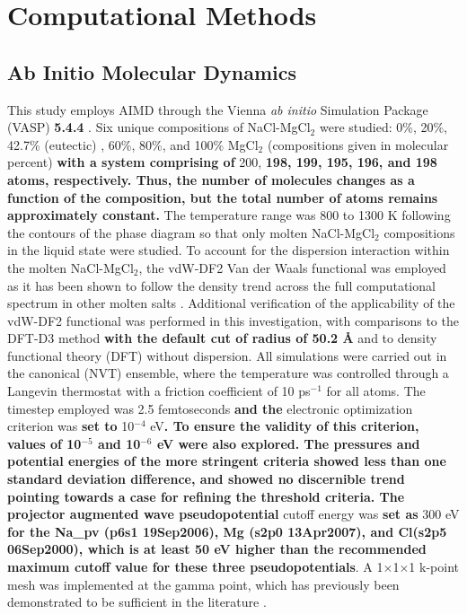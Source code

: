\documentclass[review]{elsarticle}
\providecommand{\DIFaddtex}[1]{{\bf #1}} %
\providecommand{\DIFdeltex}[1]{} %
\providecommand{\DIFaddbegin}{\protect\color{blue}} %
\providecommand{\DIFaddend}{\protect\color{black}} %
\providecommand{\DIFdelbegin}{\protect\color{red}} %
\providecommand{\DIFdelend}{\protect\color{black}} %
\providecommand{\DIFadd}[1]{\texorpdfstring{\DIFaddtex{#1}}{#1}} %
\providecommand{\DIFdel}[1]{\texorpdfstring{\DIFdeltex{#1}}{}} %
\newcommand{\DIFscaledelfig}{0.5}
\newlength{\DIFdelgraphicswidth} %
\newlength{\DIFdelgraphicsheight} %
\newcommand{\DIFaddincludegraphics}[2][]{{\color{blue}\fbox{\DIFOincludegraphics[#1]{#2}}}} %
\newcommand{\DIFdelincludegraphics}[2][]{%
\sbox{\DIFdelgraphicsbox}{\DIFOincludegraphics[#1]{#2}}%
\settoboxwidth{\DIFdelgraphicswidth}{\DIFdelgraphicsbox} %
\settoboxtotalheight{\DIFdelgraphicsheight}{\DIFdelgraphicsbox} %
\scalebox{\DIFscaledelfig}{%
\parbox[b]{\DIFdelgraphicswidth}{\usebox{\DIFdelgraphicsbox}\\[-\baselineskip] \rule{\DIFdelgraphicswidth}{0em}}\llap{\resizebox{\DIFdelgraphicswidth}{\DIFdelgraphicsheight}{%
\setlength{\unitlength}{\DIFdelgraphicswidth}%
\begin{picture}(1,1)%
\thicklines\linethickness{2pt} %
{\color[rgb]{1,0,0}\put(0,0){\framebox(1,1){}}}%
{\color[rgb]{1,0,0}\put(0,0){\line( 1,1){1}}}%
{\color[rgb]{1,0,0}\put(0,1){\line(1,-1){1}}}%
\end{picture}%
}\hspace*{3pt}}} %
} %
\DeclareRobustCommand{\DIFaddbegin}{\DIFOaddbegin \let\includegraphics\DIFaddincludegraphics} %
\DeclareRobustCommand{\DIFaddend}{\DIFOaddend \let\includegraphics\DIFOincludegraphics} %
\DeclareRobustCommand{\DIFdelbegin}{\DIFOdelbegin \let\includegraphics\DIFdelincludegraphics} %
\DeclareRobustCommand{\DIFdelend}{\DIFOaddend \let\includegraphics\DIFOincludegraphics} %
\begin{document}
\section{Computational Methods}

\subsection{Ab Initio Molecular Dynamics}
This study employs AIMD through the Vienna \textit{ab initio} Simulation Package (VASP) \DIFaddbegin \DIFadd{5.4.4 }\DIFaddend \cite{Kresse1993,Kresse1996,Kresse1996a}. Six unique compositions of NaCl-MgCl$_{2}$ were studied: 0\%, 20\%, 42.7\% (eutectic) \cite{FTsalt}, 60\%, 80\%, and 100\% MgCl$_{2}$ (compositions given in molecular percent) \DIFdelbegin \DIFdel{. The size of the systems was approximately }\DIFdelend \DIFaddbegin \DIFadd{with a system comprising of }\DIFaddend 200\DIFdelbegin \DIFdel{atoms}\DIFdelend , \DIFdelbegin \DIFdel{with small variations due to compositional variance. }\DIFdelend \DIFaddbegin \DIFadd{198, 199, 195, 196, and 198 atoms, respectively. Thus, the number of molecules changes as a function of the composition, but the total number of atoms remains approximately constant. }\DIFaddend The temperature range was 800 to 1300 K following the contours of the phase diagram \cite{FTsalt} so that only molten NaCl-MgCl$_{2}$ compositions in the liquid state were studied. To account for the dispersion interaction within the molten NaCl-MgCl$_{2}$, the vdW-DF2 Van der Waals functional \cite{Dion2004} was employed as it has been shown to follow the density trend across the full computational spectrum in other molten salts \cite{Duemmler2021}. Additional verification of the applicability of the vdW-DF2 functional was performed in this investigation, with comparisons to the DFT-D3 \cite{grimm2010} method \DIFaddbegin \DIFadd{with the default cut of radius of 50.2 \r{A} }\DIFaddend and to density functional theory (DFT) without dispersion. All simulations were carried out in the canonical (NVT) ensemble, where the temperature was controlled through a Langevin thermostat with a friction coefficient of 10 ps$^{-1}$ for all atoms. The timestep employed was 2.5 femtoseconds \DIFdelbegin \DIFdel{. The }\DIFdelend \DIFaddbegin \DIFadd{and the }\DIFaddend electronic optimization criterion was \DIFaddbegin \DIFadd{set to }\DIFaddend 10$^{-4}$ eV\DIFdelbegin \DIFdel{and the }\DIFdelend \DIFaddbegin \DIFadd{. To ensure the validity of this criterion, values of 10$^{-5}$ and 10$^{-6}$ eV were also explored. The pressures and potential energies of the more stringent criteria showed less than one standard deviation difference, and showed no discernible trend pointing towards a case for refining the threshold criteria. The projector augmented wave pseudopotential }\DIFaddend cutoff energy was \DIFaddbegin \DIFadd{set as }\DIFaddend 300 eV \DIFaddbegin \DIFadd{for the Na\_pv (p6s1 19Sep2006), Mg (s2p0 13Apr2007), and Cl(s2p5 06Sep2000), which is at least 50 eV higher than the recommended maximum cutoff value for these three pseudopotentials}\DIFaddend . A 1$\times$1$\times$1 k-point mesh was implemented at the gamma point, which has previously been demonstrated to be sufficient in the literature \cite{Bengston2014,Song2017}.
\end{document}
